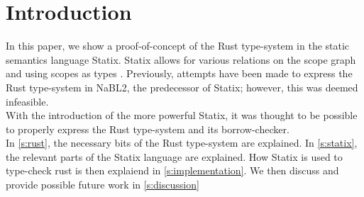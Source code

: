 \section{Introduction}
In this paper, we show a proof-of-concept of the Rust type-system in the static semantics language Statix. Statix allows for various relations on the scope graph and using scopes as types \citep{antwerpen}. Previously, attempts have been made to express the Rust type-system in NaBL2, the predecessor of Statix; however, this was deemed infeasible. \\
With the introduction of the more powerful Statix, it was thought to be possible to properly express the Rust type-system and its borrow-checker.\\
In \autoref{s:rust}, the necessary bits of the Rust type-system are explained. In \autoref{s:statix}, the relevant parts of the Statix language are explained. How Statix is used to type-check rust is then explaiend in \autoref{s:implementation}. We then discuss and provide possible future work in \autoref{s:discussion} 











